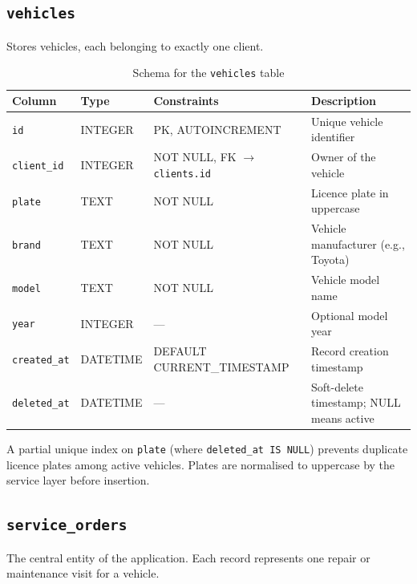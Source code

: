 \documentclass[12pt, a4paper]{report}
\begin{document}
	\subsection{\texttt{vehicles}}
	Stores vehicles, each belonging to exactly one client.

	\begin{table}[H]
		\centering
		\begin{tabularx}{\textwidth}{l l l X}
			\toprule
			\textbf{Column}    & \textbf{Type}   & \textbf{Constraints}   & \textbf{Description} \\
			\midrule
			\texttt{id}         & INTEGER & PK, AUTOINCREMENT      & Unique vehicle identifier \\
			\texttt{client\_id}  & INTEGER & NOT NULL, FK $\rightarrow$ \texttt{clients.id} & Owner of the vehicle \\
			\texttt{plate}      & TEXT    & NOT NULL               & Licence plate in uppercase \\
			\texttt{brand}      & TEXT    & NOT NULL               & Vehicle manufacturer (e.g., Toyota) \\
			\texttt{model}      & TEXT    & NOT NULL               & Vehicle model name \\
			\texttt{year}       & INTEGER & ---                    & Optional model year \\
			\texttt{created\_at} & DATETIME & DEFAULT CURRENT\_TIMESTAMP & Record creation timestamp \\
			\texttt{deleted\_at} & DATETIME & ---                   & Soft-delete timestamp; NULL means active \\
			\bottomrule
		\end{tabularx}
		\caption{Schema for the \texttt{vehicles} table}
		\label{tab:vehicles}
	\end{table}

	A partial unique index on \texttt{plate} (where \texttt{deleted\_at IS NULL})
	prevents duplicate licence plates among active vehicles. Plates are
	normalised to uppercase by the service layer before insertion.

	\subsection{\texttt{service\_orders}}
	The central entity of the application. Each record represents one repair
	or maintenance visit for a vehicle.
\end{document}
